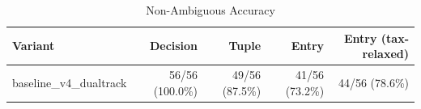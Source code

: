 \begin{table}[htbp]
\centering
\caption{Non-Ambiguous Accuracy}
\label{tab:acc-non-ambig}
\begin{tabular}{l rrrr}
\toprule
Variant & Decision & Tuple & Entry & Entry (tax-relaxed) \\
\midrule
  baseline\_v4\_dualtrack & 56/56 (100.0\%) & 49/56 (87.5\%) & 41/56 (73.2\%) & 44/56 (78.6\%) \\
\bottomrule
\end{tabular}
\end{table}

